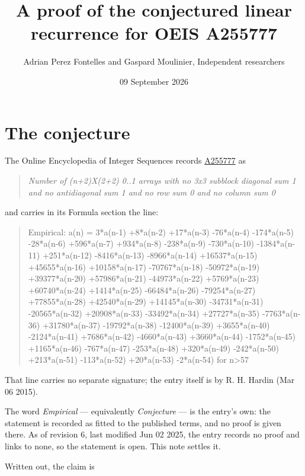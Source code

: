 \documentclass[11pt]{article}
\title{A proof of the conjectured linear recurrence for OEIS A255777}
\author{Adrian Perez Fontelles and Gaspard Moulinier, Independent researchers}
\date{09 September 2026}
\theoremstyle{definition}
\begin{document}
\maketitle
\section{The conjecture}

The Online Encyclopedia of Integer Sequences records \href{https://oeis.org/A255777}{A255777} as

\begin{quote}\itshape Number of (n+2)X(2+2) 0..1 arrays with no 3x3 subblock diagonal sum 1 and no antidiagonal sum 1 and no row sum 0 and no column sum 0\end{quote}

and carries in its Formula section the line:

\begin{quote}\ttfamily Empirical: a(n) = 3*a(n-1) +8*a(n-2) +17*a(n-3) -76*a(n-4) -174*a(n-5) -28*a(n-6) +596*a(n-7) +934*a(n-8) -238*a(n-9) -730*a(n-10) -1384*a(n-11) +251*a(n-12) -8416*a(n-13) -8966*a(n-14) +16537*a(n-15) +45655*a(n-16) +10158*a(n-17) -70767*a(n-18) -50972*a(n-19) +39377*a(n-20) +57986*a(n-21) -44973*a(n-22) +5769*a(n-23) +60740*a(n-24) +1414*a(n-25) -66484*a(n-26) -79254*a(n-27) +77855*a(n-28) +42540*a(n-29) +14145*a(n-30) -34731*a(n-31) -20565*a(n-32) +20908*a(n-33) -33492*a(n-34) +27727*a(n-35) -7763*a(n-36) +31780*a(n-37) -19792*a(n-38) -12400*a(n-39) +3655*a(n-40) -2124*a(n-41) +7686*a(n-42) -4660*a(n-43) +3660*a(n-44) -1752*a(n-45) +1165*a(n-46) -767*a(n-47) -253*a(n-48) +320*a(n-49) -242*a(n-50) +213*a(n-51) -113*a(n-52) +20*a(n-53) -2*a(n-54) for n>57\end{quote}

That line carries no separate signature; the entry itself is by R. H. Hardin (Mar 06 2015).

The word {\itshape Empirical} --- equivalently {\itshape Conjecture} --- is the entry's own: the statement is recorded as fitted to the published terms, and no proof is given there. As of revision 6, last modified Jun 02 2025, the entry records no proof and links to none, so the statement is open. This note settles it.

Written out, the claim is
\end{document}
